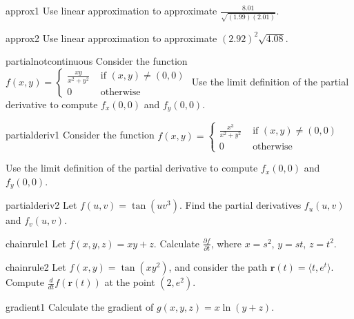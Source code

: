 \begin{problem}{approx1}
    Use linear approximation to approximate $\frac{8.01}{\sqrt{(1.99)(2.01)}}$.
\end{problem}

\begin{problem}{approx2}
    Use linear approximation to approximate $(2.92)^2\sqrt{4.08}$.
\end{problem}

\begin{problem}{partialnotcontinuous}
    Consider the function $f(x,y) = \left\{
		\begin{array}{ll}
			\frac{xy}{x^2 + y^2} & \text{ if } (x,y) \neq (0,0) \\
			0 & \text{ otherwise } 
		\end{array}
		\right.$  Use the limit definition of the partial derivative to compute $f_x(0,0)$ and $f_y(0,0)$.
\end{problem}

\begin{problem}{partialderiv1}
    Consider the function $f(x,y) = \left\{
		\begin{array}{ll}
			\frac{x^3}{x^2 + y^2} & \text{ if } (x,y) \neq (0,0) \\
			0 & \text{ otherwise } 
		\end{array}
		\right.$
		
		Use the limit definition of the partial derivative to compute $f_x(0,0)$ and $f_y(0,0)$.
\end{problem}

\begin{problem}{partialderiv2}
    Let $f(u,v) = \tan(uv^3)$.  Find the partial derivatives $f_u(u,v)$ and $f_v(u,v)$.
\end{problem}


\begin{problem}{chainrule1}
    Let $f(x,y,z) = xy + z$.  Calculate $\frac{\partial f}{\partial t}$, where $x = s^2$, $y = st$, $z = t^2$.
\end{problem}

\begin{problem}{chainrule2}
    Let $f(x,y) = \tan(xy^2)$, and consider the path $\bm{r}(t) = \langle t, e^t \rangle$.  Compute $\frac{d}{dt}f(\bm{r}(t))$ at the point $(2,e^2)$.
\end{problem}

\begin{problem}{gradient1}
    Calculate the gradient of $g(x,y,z) = x\ln(y+z)$.
\end{problem}


